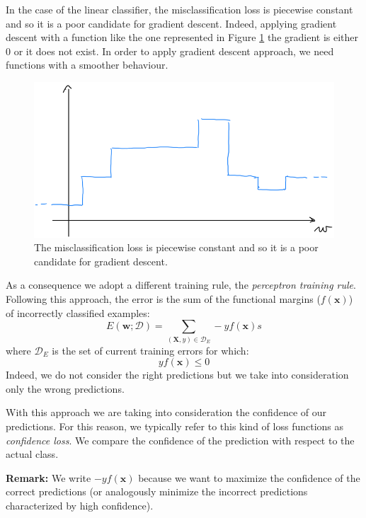 In the case of the linear classifier, the misclassification loss is piecewise
constant and so it is a poor candidate for gradient descent. Indeed, applying
gradient descent with a function like the one represented in Figure
\ref{fig:scalini} the gradient is either 0 or it does not exist. In order to apply
gradient descent approach, we need functions with a smoother behaviour.
\begin{figure}[H]
	\centering
	\includegraphics[width=\textwidth]{
		images/12_LinearDiscriminantFunctions_misclassificationLoss.png
	}
	\caption{The misclassification loss is piecewise constant and so it is a poor
	candidate for gradient descent.}
	\label{fig:scalini}
\end{figure}
As a consequence we adopt a different training rule, the \textit{perceptron
training rule}. Following this approach, the error is the sum of the functional margins
($f(\pmb{x})$) of incorrectly classified examples:
\begin{equation}
	\label{perceptronTrainingRule1}E(\pmb{w}; \mathcal{D}) = \sum_{(\pmb{X},y) \in
	\mathcal{D}_E}-y f(\pmb{x})s
\end{equation}
where $\mathcal{D}_{E}$ is the set of current training errors for which:
\[
	y f(\pmb{x}) \leq 0
\]
Indeed, we do not consider the right predictions but we take into consideration
only the wrong predictions.
\newline

With this approach we are taking into consideration the confidence of our
predictions. For this reason, we typically refer to this kind of loss functions
as \textit{confidence loss}. We compare the confidence of the prediction with
respect to the actual class.
\newline

\textbf{Remark:} We write $- y f(\pmb{x})$ because we want to maximize the confidence
of the correct predictions (or analogously minimize the incorrect predictions
characterized by high confidence).
\newline

